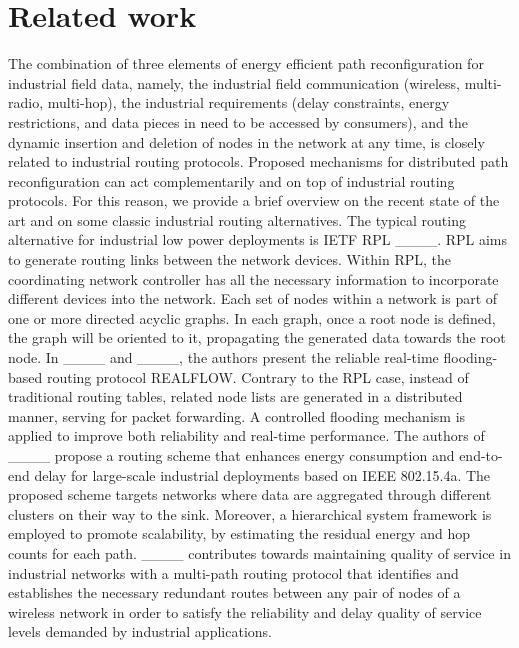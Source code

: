 \section{Related work}
\label{sec::related}

The combination of three elements of energy efficient path reconfiguration for industrial field data, namely, the industrial field communication (wireless, multi-radio, multi-hop), the industrial requirements (delay constraints, energy restrictions, and data pieces in need to be accessed by consumers), and the dynamic insertion and deletion of nodes in the network at any time, is closely related to industrial routing protocols. Proposed mechanisms for distributed path reconfiguration can act complementarily and on top of industrial routing protocols. For this reason, we provide a brief overview on the recent state of the art and on some classic industrial routing alternatives. The typical routing alternative for industrial low power deployments is IETF RPL ____. RPL aims to generate routing links between the network devices. Within RPL, the coordinating network controller has all the necessary information to incorporate different devices into the network. Each set of nodes within a network is part of one or more directed acyclic graphs. In each graph, once a root node is defined, the graph will be oriented to it, propagating the generated data towards the root node. In ____ and ____, the authors present the reliable real-time flooding-based routing protocol REALFLOW. Contrary to the RPL case, instead of traditional routing tables, related node lists are generated in a distributed manner, serving for packet forwarding. A controlled flooding mechanism is applied to improve both reliability and real-time performance. The authors of ____ propose a routing scheme that enhances energy consumption and end-to-end delay for large-scale industrial deployments based on IEEE 802.15.4a. The proposed scheme targets networks where data are aggregated through different clusters on their way to the sink. Moreover, a hierarchical system framework is employed to promote scalability, by estimating the residual energy and hop counts for each path. ____ contributes towards maintaining quality of service in industrial networks with a multi-path routing protocol that identifies and establishes the necessary redundant routes between any pair of nodes of a wireless network in order to satisfy the reliability and delay quality of service levels demanded by industrial applications.